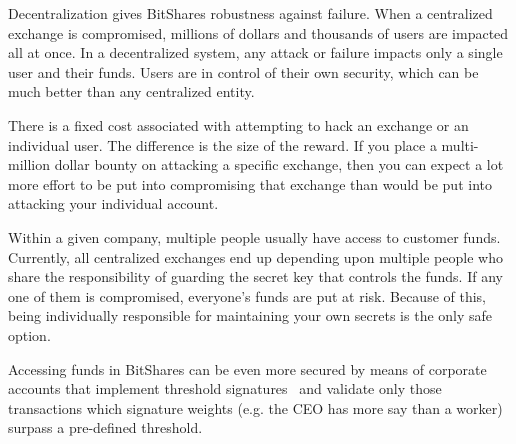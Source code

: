 Decentralization gives BitShares robustness against failure. When a
centralized exchange is compromised, millions of dollars and thousands of users
are impacted all at once. In a decentralized system, any attack or failure
impacts only a single user and their funds. Users are in control of their own
security, which can be much better than any centralized entity.

There is a fixed cost associated with attempting to hack an exchange or an
individual user. The difference is the size of the reward. If you place a
multi-million dollar bounty on attacking a specific exchange, then you can
expect a lot more effort to be put into compromising that exchange than would
be put into attacking your individual account.

Within a given company, multiple people usually have access to customer funds.
%
%
Currently, all centralized exchanges end up depending upon multiple people who
share the responsibility of guarding the secret key that controls the funds.
If any one of them is compromised, everyone's funds are put at risk. Because of
this, being individually responsible for maintaining your own secrets is the
only safe option.

Accessing funds in BitShares can be even more secured by means of corporate
accounts that implement threshold signatures~\cite{} and validate only those
transactions which signature weights (e.g. the CEO has more say than a worker)
surpass a pre-defined threshold.
